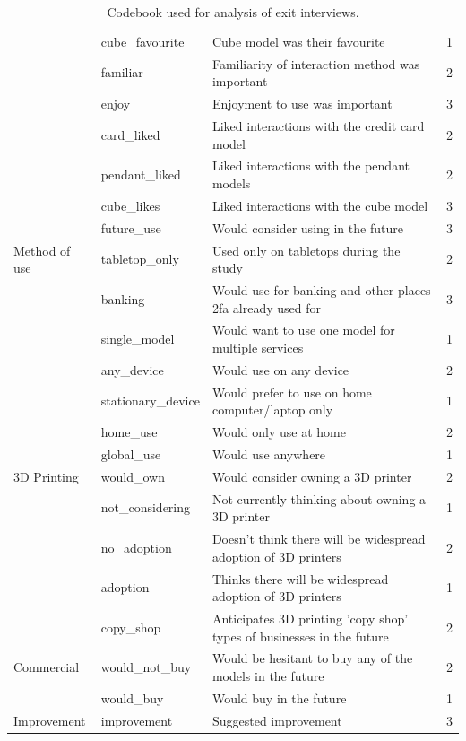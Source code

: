 \documentclass{l4proj}
\begin{document}
\begin{appendices}
\begin{table}[]
{\begin{tabular}{p{2.5cm}|p{4cm}|p{9cm}|c}
        & cube\_favourite & Cube model was their favourite & 1 \\
        & familiar & Familiarity of interaction method was important & 2 \\
        & enjoy & Enjoyment to use was important & 3 \\
        & card\_liked & Liked interactions with the credit card model &2 \\
        & pendant\_liked & Liked interactions with the pendant models & 2 \\
        & cube\_likes & Liked interactions with the cube model & 3 \\
        & future\_use & Would consider using in the future & 3 \\
        \midrule
        Method of use & tabletop\_only & Used only on tabletops during the study & 2 \\
        & banking & Would use for banking and other places 2fa already used for & 3 \\
        & single\_model & Would want to use one model for multiple services & 1 \\
        & any\_device & Would use on any device & 2 \\
        & stationary\_device & Would prefer to use on home computer/laptop only & 1 \\
        & home\_use & Would only use at home & 2 \\
        & global\_use & Would use anywhere & 1 \\
        \midrule
        3D Printing & would\_own & Would consider owning a 3D printer & 2 \\
        & not\_considering & Not currently thinking about owning a 3D printer & 1 \\
        & no\_adoption & Doesn't think there will be widespread adoption of 3D printers & 2 \\
        & adoption & Thinks there will be widespread adoption of 3D printers & 1 \\
        & copy\_shop & Anticipates 3D printing 'copy shop' types of businesses in the future & 2 \\
        Commercial & would\_not\_buy & Would be hesitant to buy any of the models in the future & 2 \\
        & would\_buy & Would buy in the future & 1 \\
        \midrule
        Improvement & improvement & Suggested improvement & 3 \\
        \bottomrule
    \end{tabular}}
    \caption{Codebook used for analysis of exit interviews.}
\end{table}

\end{appendices}
\end{document}
